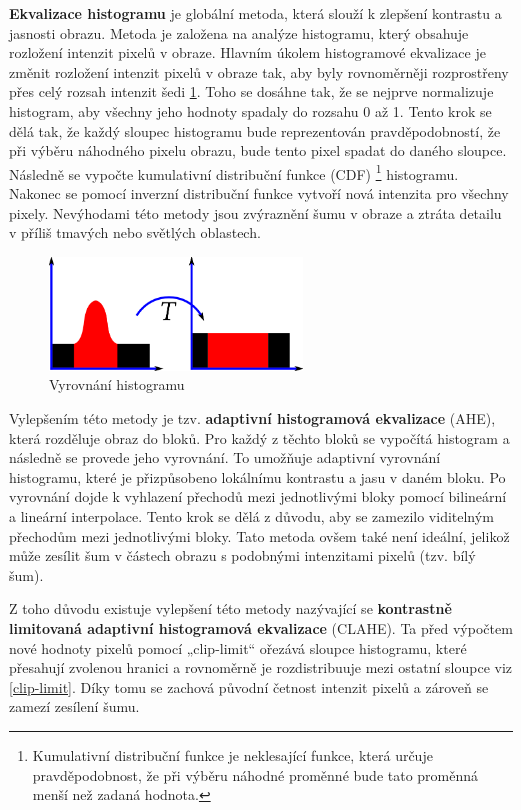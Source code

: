 \textbf{Ekvalizace histogramu} je globální metoda, která slouží k zlepšení kontrastu a jasnosti obrazu. Metoda je založena na analýze histogramu, který obsahuje rozložení intenzit pixelů v obraze. Hlavním úkolem histogramové ekvalizace je změnit rozložení intenzit pixelů v obraze tak, aby byly rovnoměrněji rozprostřeny přes celý rozsah intenzit šedi \ref{histo_equ}. Toho se dosáhne tak, že se nejprve normalizuje histogram, aby všechny jeho hodnoty spadaly do rozsahu 0 až 1. Tento krok se dělá tak, že každý sloupec histogramu bude reprezentován pravděpodobností, že při výběru náhodného pixelu obrazu, bude tento pixel spadat do daného sloupce. Následně se vypočte kumulativní distribuční funkce (CDF) \footnote{Kumulativní distribuční funkce je neklesající funkce, která určuje pravděpodobnost, že při výběru náhodné proměnné bude tato proměnná menší než zadaná hodnota.} histogramu. Nakonec se pomocí inverzní distribuční funkce vytvoří nová intenzita pro všechny pixely. Nevýhodami této metody jsou zvýraznění šumu v obraze a ztráta detailu v příliš tmavých nebo světlých oblastech. 

\begin{figure}[h]
	\centering
	\includegraphics[width=0.6\textwidth]{obrazky/Histogram.png}
	\caption{Vyrovnání histogramu \cite{histo_equ}}
	\label{histo_equ}
\end{figure}


Vylepšením této metody je tzv. \textbf{adaptivní histogramová ekvalizace} (AHE), která rozděluje obraz do bloků. Pro každý z těchto bloků se vypočítá histogram a následně se provede jeho vyrovnání. To umožňuje adaptivní vyrovnání histogramu, které je přizpůsobeno lokálnímu kontrastu a jasu v daném bloku. Po vyrovnání dojde k vyhlazení přechodů mezi jednotlivými bloky pomocí bilineární a lineární interpolace. Tento krok se dělá z důvodu, aby se zamezilo viditelným přechodům mezi jednotlivými bloky. Tato metoda ovšem také není ideální, jelikož může zesílit šum v částech obrazu s podobnými intenzitami pixelů (tzv. bílý šum).

Z toho důvodu existuje vylepšení této metody nazývající se \textbf{kontrastně limitovaná adaptivní histogramová ekvalizace} (CLAHE). Ta před výpočtem nové hodnoty pixelů pomocí „clip-limit“ ořezává sloupce histogramu, které přesahují zvolenou hranici a rovnoměrně je rozdistribuuje mezi ostatní sloupce viz \ref{clip-limit}. Díky tomu se zachová původní četnost intenzit pixelů a zároveň se zamezí zesílení šumu.

